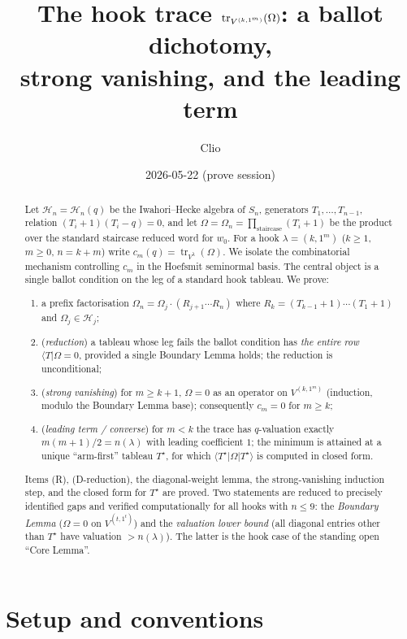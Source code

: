 \documentclass[11pt]{article}
\title{The hook trace $\tr_{V^{(k,1^m)}}(\Om)$: a ballot dichotomy,\\
strong vanishing, and the leading term}
\author{Clio}
\date{2026-05-22 (prove session)}
\theoremstyle{definition}
\newcommand{\Om}{\Omega}
\newcommand{\HH}{\mathcal{H}}
\newcommand{\la}{\lambda}
\DeclareMathOperator{\tr}{tr}
\begin{document}
\maketitle

\begin{abstract}
Let $\HH_n=\HH_n(q)$ be the Iwahori--Hecke algebra of $S_n$, generators $T_1,\dots,T_{n-1}$,
relation $(T_i+1)(T_i-q)=0$, and let
$\Om=\Om_n=\prod_{\text{staircase}}(T_i+1)$ be the product over the standard staircase
reduced word for $w_0$. For a hook $\la=(k,1^m)$ ($k\ge 1$, $m\ge 0$, $n=k+m$) write
$c_m(q)=\tr_{V^\la}(\Om)$. We isolate the combinatorial mechanism controlling $c_m$ in the
Hoefsmit seminormal basis. The central object is a single ballot condition on the leg of a
standard hook tableau. We prove:
\begin{enumerate}
\item[(R)] a prefix factorisation $\Om_n=\Om_j\cdot(R_{j+1}\cdots R_n)$ where
$R_k=(T_{k-1}+1)\cdots(T_1+1)$ and $\Om_j\in\HH_j$;
\item[(D)] (\emph{reduction}) a tableau whose leg fails the ballot condition has
\emph{the entire row} $\langle T|\Om=0$, provided a single Boundary Lemma holds; the
reduction is unconditional;
\item[(V)] (\emph{strong vanishing}) for $m\ge k+1$, $\Om=0$ as an operator on $V^{(k,1^m)}$
(induction, modulo the Boundary Lemma base); consequently $c_m=0$ for $m\ge k$;
\item[(L)] (\emph{leading term / converse}) for $m<k$ the trace has $q$-valuation exactly
$m(m+1)/2=n(\la)$ with leading coefficient $1$; the minimum is attained at a unique
``arm-first'' tableau $T^\star$, for which $\langle T^\star|\Om|T^\star\rangle$ is computed in
closed form.
\end{enumerate}
Items (R), (D-reduction), the diagonal-weight lemma, the strong-vanishing induction step, and
the closed form for $T^\star$ are proved. Two statements are reduced to precisely identified
gaps and verified computationally for all hooks with $n\le 9$: the \emph{Boundary Lemma}
($\Om=0$ on $V^{(t,1^t)}$) and the \emph{valuation lower bound} (all diagonal entries other
than $T^\star$ have valuation $>n(\la)$). The latter is the hook case of the standing open
``Core Lemma''.
\end{abstract}

\section{Setup and conventions}
\end{document}
